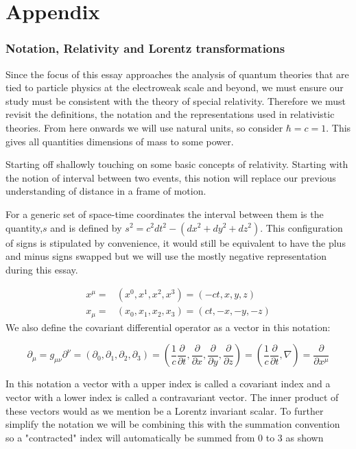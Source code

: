 \documentclass[12pt]{article}
\begin{document}
\newpage 
\section{Appendix}
\subsubsection{Notation, Relativity and Lorentz transformations}

Since the focus of this essay approaches the analysis of quantum theories that are tied to particle physics at the electroweak scale and beyond, we must ensure our study must be consistent with the theory of special relativity. Therefore we must revisit the definitions, the notation and the representations used in relativistic theories. From here onwards we will use natural units, so consider $\hbar=c=1$. This gives all quantities dimensions of mass to some power.

Starting off shallowly touching on some basic concepts of relativity. Starting with the notion of interval between two events, this notion will replace our previous understanding of distance in a frame of motion. 

For a generic set of space-time coordinates the interval between them is the quantity,$s$ and is defined by $s^2=c^2 dt^2 - (dx^2 +dy^2 + dz^2) $. This configuration of signs is stipulated by convenience, it would still be equivalent to have the plus and minus signs swapped but we will use the mostly negative representation during this essay.



\begin{align}
x^\mu= & (x^0,x^1 ,x^2 ,x^3) = (-ct,x,y,z)  \\  x_\mu= & (x_0,x_1 ,x_2 ,x_3) = (ct,-x,-y,-z)  
\end{align}
We also define the covariant differential operator as a vector in this notation: 

\begin{equation}
\partial_\mu = g_{\mu \nu} \partial^\nu = (\partial_0,\partial_1 ,\partial_2 ,\partial_3)=(\frac{1}{c} \frac{\partial }{\partial t },\frac{\partial }{\partial x },\frac{\partial }{\partial y },\frac{\partial }{\partial z })=(\frac{1}{c} \frac{\partial}{\partial t} , \nabla)=\frac{\partial}{\partial x^\mu}
\end{equation}

In this notation a vector with a upper index is called a covariant index and a vector with a lower index is called a contravariant vector. The inner product of these vectors would as we mention be a Lorentz invariant scalar. To further simplify the notation we will be combining this with the summation convention so a "contracted" index will automatically be summed from 0 to 3 as shown 
\end{document}
